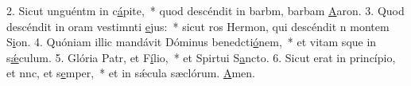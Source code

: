 2. Sicut unguéntm in c\uline{á}pite,~* quod descéndit in barbm, barbam \uline{A}aron.
3. Quod descéndit in oram vestimnti \uline{e}jus:~* sicut ros Hermon, qui descéndit n montem S\uline{i}on.
4. Quóniam illic mandávit Dóminus benedcti\uline{ó}nem,~* et vitam sque in s\uline{ǽ}culum.
5. Glória Patr, et F\uline{í}lio,~* et Spirtui S\uline{a}ncto.
6. Sicut erat in princípio, et nnc, et s\uline{e}mper,~* et in sǽcula sæclórum. \uline{A}men.
